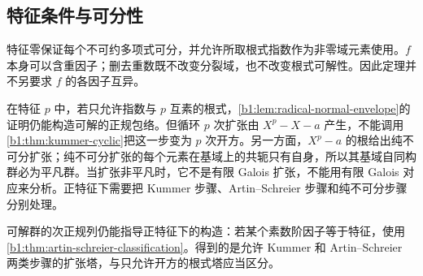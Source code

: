 \subsection{特征条件与可分性}
\label{b1:subsec:2102:03}

特征零保证每个不可约多项式可分，并允许所取根式指数作为非零域元素使用。\(f\) 本身可以含重因子；删去重数既不改变分裂域，也不改变根式可解性。因此定理并不另要求 \(f\) 的各因子互异。

\ProseParagraphBreak
在特征 \(p\) 中，若只允许指数与 \(p\) 互素的根式，\cref{b1:lem:radical-normal-envelope}的证明仍能构造可解的正规包络。但循环 \(p\) 次扩张由 \(X^p-X-a\) 产生，不能调用\cref{b1:thm:kummer-cyclic}把这一步变为 \(p\) 次开方。另一方面，\(X^p-a\) 的根给出纯不可分扩张；纯不可分扩张的每个元素在基域上的共轭只有自身，所以其基域自同构群必为平凡群。当扩张非平凡时，它不是有限 Galois 扩张，不能用有限 Galois 对应来分析。正特征下需要把 Kummer 步骤、Artin--Schreier 步骤和纯不可分步骤分别处理。

\ProseParagraphBreak
可解群的次正规列仍能指导正特征下的构造：若某个素数阶因子等于特征，使用\cref{b1:thm:artin-schreier-classification}。得到的是允许 Kummer 和 Artin--Schreier 两类步骤的扩张塔，与只允许开方的根式塔应当区分。
